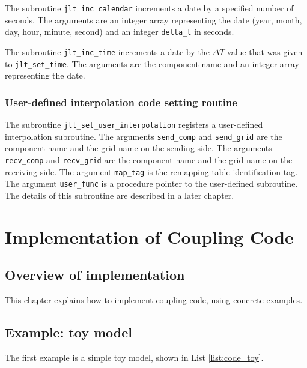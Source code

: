 \documentclass[11pt,a4paper]{report}
\newcommand{\lstref}[1]{List \ref{#1}}
\begin{document}
The subroutine \texttt{jlt\_inc\_calendar}
increments a date by a specified number of seconds.
The arguments are
an integer array representing the date
(year, month, day, hour, minute, second)
and an integer \texttt{delta\_t} in seconds.

The subroutine \texttt{jlt\_inc\_time}
increments a date by the $\Delta T$ value
that was given to \texttt{jlt\_set\_time}.
The arguments are the component name
and an integer array representing the date.

\subsection{User-defined interpolation code setting routine}

The subroutine \texttt{jlt\_set\_user\_interpolation}
registers a user-defined interpolation subroutine.
The arguments \texttt{send\_comp} and \texttt{send\_grid}
are the component name and the grid name
on the sending side.
The arguments \texttt{recv\_comp} and \texttt{recv\_grid}
are the component name and the grid name
on the receiving side.
The argument \texttt{map\_tag}
is the remapping table identification tag.
The argument \texttt{user\_func}
is a procedure pointer to the user-defined subroutine.
The details of this subroutine are described
in a later chapter.


\chapter{Implementation of Coupling Code}

\section{Overview of implementation}

This chapter explains how to implement coupling code,
using concrete examples.

\section{Example: toy model}

The first example is a simple toy model,
shown in \lstref{list:code_toy}.
\end{document}
